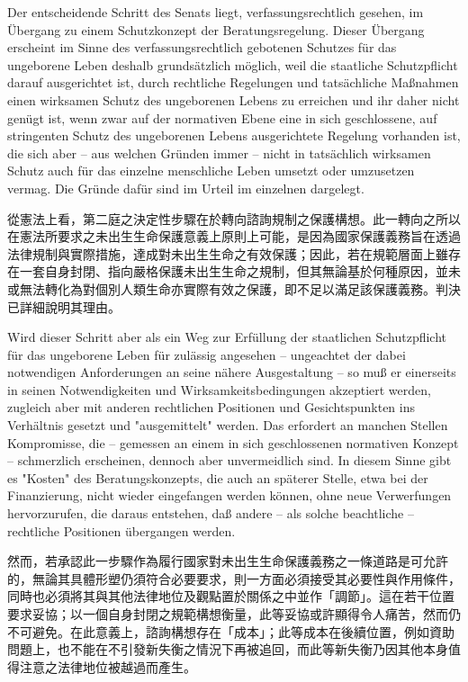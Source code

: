 \documentclass[12pt]{article}
\begin{document}
\begin{sourcepara}[title={原文SondervotumB.330}]
Der entscheidende Schritt des Senats liegt, verfassungsrechtlich gesehen, im Übergang zu einem Schutzkonzept der Beratungsregelung. Dieser Übergang erscheint im Sinne des verfassungsrechtlich gebotenen Schutzes für das ungeborene Leben deshalb grundsätzlich möglich, weil die staatliche Schutzpflicht darauf ausgerichtet ist, durch rechtliche Regelungen und tatsächliche Maßnahmen einen wirksamen Schutz des ungeborenen Lebens zu erreichen und ihr daher nicht genügt ist, wenn zwar auf der normativen Ebene eine in sich geschlossene, auf stringenten Schutz des ungeborenen Lebens ausgerichtete Regelung vorhanden ist, die sich aber -- aus welchen Gründen immer -- nicht in tatsächlich wirksamen Schutz auch für das einzelne menschliche Leben umsetzt oder umzusetzen vermag. Die Gründe dafür sind im Urteil im einzelnen dargelegt.
\end{sourcepara}
\begin{transpara}
從憲法上看，第二庭之決定性步驟在於轉向諮詢規制之保護構想。此一轉向之所以在憲法所要求之未出生生命保護意義上原則上可能，是因為國家保護義務旨在透過法律規制與實際措施，達成對未出生生命之有效保護；因此，若在規範層面上雖存在一套自身封閉、指向嚴格保護未出生生命之規制，但其無論基於何種原因，並未或無法轉化為對個別人類生命亦實際有效之保護，即不足以滿足該保護義務。判決已詳細說明其理由。
\end{transpara}

\begin{sourcepara}[title={原文SondervotumB.331}]
Wird dieser Schritt aber als ein Weg zur Erfüllung der staatlichen Schutzpflicht für das ungeborene Leben für zulässig angesehen -- ungeachtet der dabei notwendigen Anforderungen an seine nähere Ausgestaltung -- so muß er einerseits in seinen Notwendigkeiten und Wirksamkeitsbedingungen akzeptiert werden, zugleich aber mit anderen rechtlichen Positionen und Gesichtspunkten ins Verhältnis gesetzt und "ausgemittelt" werden. Das erfordert an manchen Stellen Kompromisse, die -- gemessen an einem in sich geschlossenen normativen Konzept -- schmerzlich erscheinen, dennoch aber unvermeidlich sind. In diesem Sinne gibt es "Kosten" des Beratungskonzepts, die auch an späterer Stelle, etwa bei der Finanzierung, nicht wieder eingefangen werden können, ohne neue Verwerfungen hervorzurufen, die daraus entstehen, daß andere -- als solche beachtliche -- rechtliche Positionen übergangen werden.
\end{sourcepara}
\begin{transpara}
然而，若承認此一步驟作為履行國家對未出生生命保護義務之一條道路是可允許的，無論其具體形塑仍須符合必要要求，則一方面必須接受其必要性與作用條件，同時也必須將其與其他法律地位及觀點置於關係之中並作「調節」。這在若干位置要求妥協；以一個自身封閉之規範構想衡量，此等妥協或許顯得令人痛苦，然而仍不可避免。在此意義上，諮詢構想存在「成本」；此等成本在後續位置，例如資助問題上，也不能在不引發新失衡之情況下再被追回，而此等新失衡乃因其他本身值得注意之法律地位被越過而產生。
\end{transpara}
\end{document}
